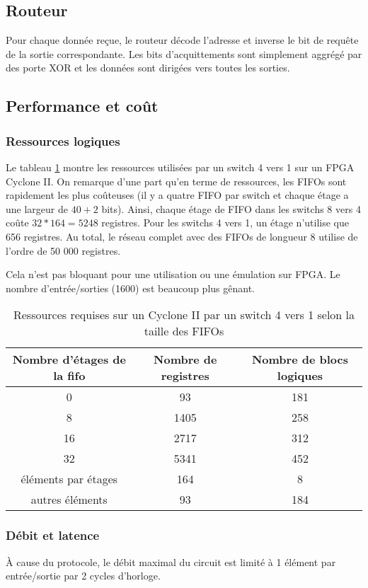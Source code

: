 \documentclass[11pt]{article}
\begin{document}
\subsection{Routeur}

Pour chaque donnée reçue, le routeur décode l'adresse et inverse le bit de requête de la sortie correspondante. Les bits d'acquittements sont simplement aggrégé par des porte XOR et les données sont dirigées vers toutes les sorties.

\subsection{Performance et coût}

\subsubsection{Ressources logiques}
Le tableau \ref{perfs-sw-4} montre les ressources utilisées par un switch 4 vers 1 sur un FPGA Cyclone II. On remarque d'une part qu'en terme de ressources, les FIFOs sont rapidement les plus coûteuses (il y a quatre FIFO par switch et chaque étage a une largeur de $40+2$ bits). Ainsi, chaque étage de FIFO dans les switchs 8 vers 4 coûte $32*164=5248$ registres. Pour les switchs 4 vers 1, un étage n'utilise que 656 registres. Au total, le réseau complet avec des FIFOs de longueur 8 utilise de l'ordre de 50 000 registres.

Cela n'est pas bloquant pour une utilisation ou une émulation sur FPGA. Le nombre d'entrée/sorties (1600) est beaucoup plus gênant.

\begin{table}
\centering
\begin{tabular}{|c|c|c|}
\hline
Nombre d'étages de la fifo & Nombre de registres & Nombre de blocs logiques \\
\hline
0 & 93 & 181 \\
8 & 1405 & 258 \\
16 &  2717 & 312 \\
32 & 5341 & 452 \\
\hline \hline
éléments par étages & 164 & 8 \\
autres éléments & 93 & 184 \\
\hline
\end{tabular}
\caption{Ressources requises sur un Cyclone II par un switch 4 vers 1 selon la taille des FIFOs}
\label{perfs-sw-4}
\end{table}

\subsubsection{Débit et latence}
\`A cause du protocole, le débit maximal du circuit est limité à 1 élément par entrée/sortie par 2 cycles d'horloge.
\end{document}
